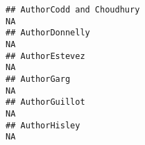 \documentclass[]{article}
\begin{document}
\begin{verbatim}
## AuthorCodd and Choudhury                                                                                                                                                                                                                                                                                                                                                                                                                                                              NA
## AuthorDonnelly                                                                                                                                                                                                                                                                                                                                                                                                                                                                        NA
## AuthorEstevez                                                                                                                                                                                                                                                                                                                                                                                                                                                                         NA
## AuthorGarg                                                                                                                                                                                                                                                                                                                                                                                                                                                                            NA
## AuthorGuillot                                                                                                                                                                                                                                                                                                                                                                                                                                                                         NA
## AuthorHisley                                                                                                                                                                                                                                                                                                                                                                                                                                                                          NA

\end{verbatim}
\end{document}
